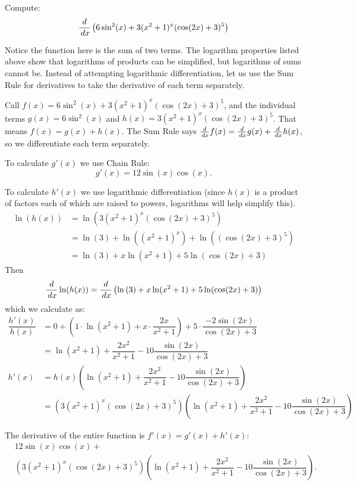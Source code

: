 \documentclass{ximera}
\begin{document}
\begin{example}
	Compute:
	\[ \frac{d}{\,d x} \left( 6\sin^2(x) + 3(x^2+1)^x(\cos(2x) + 3)^5\right) \]
	
	\begin{explanation}
		Notice the function here is the sum of two terms. The logarithm properties listed above show that logarithms of products can be simplified, but logarithms of sums cannot be.
		Instead of attempting logarithmic differentiation, let us use the Sum Rule for derivatives to take the derivative of each term separately.
		
		Call $f(x) =  6\sin^2(x) + 3(x^2+1)^x(\cos(2x) + 3)^5$, and the individual terms $g(x) =  6\sin^2(x)$ and $h(x) =  3(x^2+1)^x(\cos(2x) + 3)^5$. That means $f(x) = g(x) + h(x)$.
		The Sum Rule says $\frac{d}{\,d x} f(x) = \frac{d}{\,d x} g(x) + \frac{d}{\,d x} h(x)$, so we differentiate each term separately. 
		
		To calculate $g'(x)$ we use Chain Rule: 
		\[ g'(x) = 12\sin(x)\cos(x). \]
		
		To calculate $h'(x)$ we use logarithmic differentiation (since $h(x)$ is a product of factors each of which are raised to powers, logarithms will help simplify this).
		\begin{align*}
			\ln( h(x) ) &= \ln\left( 3(x^2+1)^x(\cos(2x) + 3)^5 \right) \\
				&= \ln\left( 3\right) + \ln\left((x^2+1)^x\right) + \ln\left( (\cos(2x) + 3)^5 \right) \\
				&= \ln\left( 3\right) + x \ln(x^2+1) + 5 \ln(\cos(2x) + 3)
		\end{align*}
		Then 
		\[ \frac{d}{\,d x} \ln( h(x) ) = \frac{d}{\,d x} \left( \ln\left( 3\right) + x \ln(x^2+1) + 5 \ln(\cos(2x) + 3) \right) \]
		which we calculate as:
		\begin{align*}
				\dfrac{h'(x)}{h(x)} &= 0 + \left( 1\cdot \ln(x^2+1) + x\cdot  \dfrac{2x}{x^2+1}\right) + 5 \cdot \dfrac{-2\sin(2x)}{\cos(2x)+3}\\
						&=  \ln(x^2+1) + \dfrac{2x^2}{x^2+1} -10 \dfrac{\sin(2x)}{\cos(2x)+3}\\
				h'(x) &= h(x)\left(\ln(x^2+1) + \dfrac{2x^2}{x^2+1} -10 \dfrac{\sin(2x)}{\cos(2x)+3}\right)\\
					&= \left(3(x^2+1)^x(\cos(2x) + 3)^5\right)\left(\ln(x^2+1) + \dfrac{2x^2}{x^2+1} -10 \dfrac{\sin(2x)}{\cos(2x)+3}\right)
		\end{align*}
		
		The derivative of the entire function is $f'(x) = g'(x) + h'(x)$:
		\begin{align*}
			&12\sin(x)\cos(x) + \\
			&\left(3(x^2+1)^x(\cos(2x) + 3)^5\right)\left(\ln(x^2+1) + \dfrac{2x^2}{x^2+1} -10 \dfrac{\sin(2x)}{\cos(2x)+3}\right). 
		\end{align*}
	\end{explanation}
	
\end{example}
\end{document}
